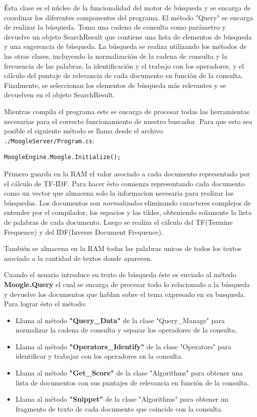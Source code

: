 \documentclass{article}
\begin{document}
Ésta clase es el núcleo de la funcionalidad del motor de búsqueda y se encarga de coordinar los diferentes componentes del programa. El método "Query" se encarga de realizar la búsqueda. Toma una cadena de consulta como parámetro y devuelve un objeto SearchResult que contiene una lista de elementos de búsqueda y una sugerencia de búsqueda. La búsqueda se realiza utilizando los métodos de las otras clases, incluyendo la normalización de la cadena de consulta y la frecuencia de las palabras, la identificación y el trabajo con los operadores, y el cálculo del puntaje de relevancia de cada documento en función de la consulta. Finalmente, se seleccionan los elementos de búsqueda más relevantes y se devuelven en el objeto SearchResult.

Mientras compila el programa este se encarga de procesar todas las herramientas necesarias para el correcto funcionamiento de nuestro buscador. Para que esto sea posible el siguiente método se llama desde el archivo \texttt{./MoogleServer/Program.cs}:

\begin{verbatim}
MoogleEngine.Moogle.Initialize();
\end{verbatim}

Primero guarda en la RAM el valor asociado a cada documento representado por el cálculo de TF-IDF. Para hacer ésto comienza representando cada documento como un vector que almacena solo la informacion necesaria para realizar las búsquedas. Los documentos son \textit{normalizados} eliminando caracteres complejos de entender por el compilador, los espacios y las tildes, obteniendo solamente la lista de palabras de cada documento. Luego se realiza el cálculo del TF(Termine Frequence) y del IDF(Inverse Document Frequence).

También se almacena en la RAM todas las palabras unicas de todos los textos asociado a la cantidad de textos donde aparecen.

Cuando el usuario introduce su texto de búsqueda éste es enviado al método \textbf{Moogle.Query} el cual se encarga de procesar todo lo relacionado a la búsqueda y devuelve los documentos que hablan sobre el tema expresado en su busqueda. Para lograr ésto el método:
\begin{itemize}
\item Llama al método \textbf{"Query\_Data"} de la clase "Query\_Manage" para normalizar la cadena de consulta y separar los operadores de la consulta.
\item Llama al método \textbf{"Operators\_Identify"} de la clase "Operators" para identificar y trabajar con los operadores en la consulta.  
\item Llama al método \textbf{"Get\_Score"} de la clase "Algorithms" para obtener una lista de documentos con sus puntajes de relevancia en función de la consulta.
\item Llama al método \textbf{"Snippet"} de la clase "Algorithms" para obtener un fragmento de texto de cada documento que coincide con la consulta.
\end{itemize}
\end{document}
